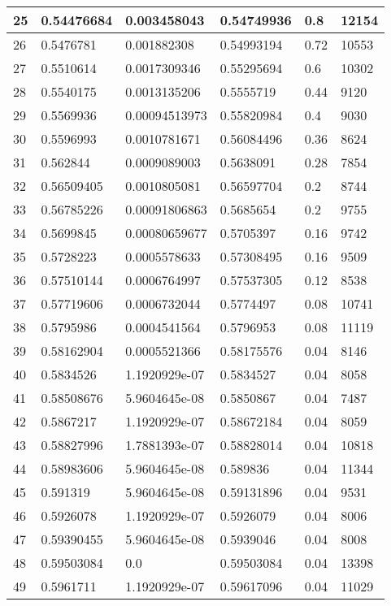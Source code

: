 \begin{longtable}{|l|l|l|l|l|l|}
25 & 0.54476684 & 0.003458043 & 0.54749936 & 0.8 & 12154 \\ \hline 
26 & 0.5476781 & 0.001882308 & 0.54993194 & 0.72 & 10553 \\ \hline 
27 & 0.5510614 & 0.0017309346 & 0.55295694 & 0.6 & 10302 \\ \hline 
28 & 0.5540175 & 0.0013135206 & 0.5555719 & 0.44 & 9120 \\ \hline 
29 & 0.5569936 & 0.00094513973 & 0.55820984 & 0.4 & 9030 \\ \hline 
30 & 0.5596993 & 0.0010781671 & 0.56084496 & 0.36 & 8624 \\ \hline 
31 & 0.562844 & 0.0009089003 & 0.5638091 & 0.28 & 7854 \\ \hline 
32 & 0.56509405 & 0.0010805081 & 0.56597704 & 0.2 & 8744 \\ \hline 
33 & 0.56785226 & 0.00091806863 & 0.5685654 & 0.2 & 9755 \\ \hline 
34 & 0.5699845 & 0.00080659677 & 0.5705397 & 0.16 & 9742 \\ \hline 
35 & 0.5728223 & 0.0005578633 & 0.57308495 & 0.16 & 9509 \\ \hline 
36 & 0.57510144 & 0.0006764997 & 0.57537305 & 0.12 & 8538 \\ \hline 
37 & 0.57719606 & 0.0006732044 & 0.5774497 & 0.08 & 10741 \\ \hline 
38 & 0.5795986 & 0.0004541564 & 0.5796953 & 0.08 & 11119 \\ \hline 
39 & 0.58162904 & 0.0005521366 & 0.58175576 & 0.04 & 8146 \\ \hline 
40 & 0.5834526 & 1.1920929e-07 & 0.5834527 & 0.04 & 8058 \\ \hline 
41 & 0.58508676 & 5.9604645e-08 & 0.5850867 & 0.04 & 7487 \\ \hline 
42 & 0.5867217 & 1.1920929e-07 & 0.58672184 & 0.04 & 8059 \\ \hline 
43 & 0.58827996 & 1.7881393e-07 & 0.58828014 & 0.04 & 10818 \\ \hline 
44 & 0.58983606 & 5.9604645e-08 & 0.589836 & 0.04 & 11344 \\ \hline 
45 & 0.591319 & 5.9604645e-08 & 0.59131896 & 0.04 & 9531 \\ \hline 
46 & 0.5926078 & 1.1920929e-07 & 0.5926079 & 0.04 & 8006 \\ \hline 
47 & 0.59390455 & 5.9604645e-08 & 0.5939046 & 0.04 & 8008 \\ \hline 
48 & 0.59503084 & 0.0 & 0.59503084 & 0.04 & 13398 \\ \hline 
49 & 0.5961711 & 1.1920929e-07 & 0.59617096 & 0.04 & 11029 \\ \hline 

\end{longtable}
